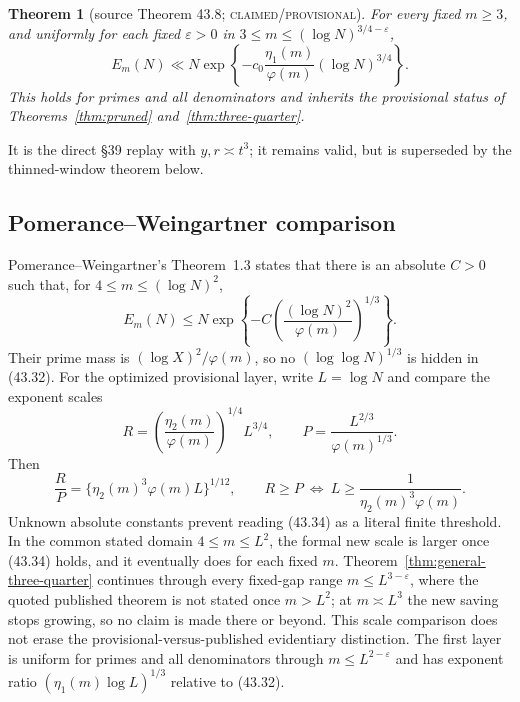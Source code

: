 \documentclass[10pt,reqno]{amsart}
\newtheorem{theorem}{Theorem}[section]
\theoremstyle{definition}
\newcommand{\1}{\mathbf 1}
\newcommand{\eps}{\varepsilon}
\begin{document}
\begin{theorem}[source Theorem 43.8; \textsc{claimed/provisional}]
\label{thm:general-three-quarter-conservative}
For every fixed $m\geq3$, and uniformly for each fixed $\eps>0$ in
$3\leq m\leq(\log N)^{3/4-\eps}$,
\begin{equation}\tag{43.28}
 E_m(N)\ll N\exp\left\{-c_0\frac{\eta_1(m)}{\varphi(m)}
                         (\log N)^{3/4}\right\}.
\end{equation}
This holds for primes and all denominators and inherits the provisional
status of Theorems~\ref{thm:pruned} and~\ref{thm:three-quarter}.
\end{theorem}
It is the direct \S39 replay with $y,r\asymp t^3$; it remains valid, but is
superseded by the thinned-window theorem below.

\subsection{Pomerance--Weingartner comparison}
Pomerance--Weingartner's Theorem~1.3 \cite{PomeranceWeingartner} states that
there is an absolute $C>0$ such that, for $4\leq m\leq(\log N)^2$,
\begin{equation}\tag{43.32}
 E_m(N)\leq N\exp\left\{-C
       \left(\frac{(\log N)^2}{\varphi(m)}\right)^{1/3}\right\}.
\end{equation}
Their prime mass is $(\log X)^2/\varphi(m)$, so no
$(\log\log N)^{1/3}$ is hidden in (43.32).  For the optimized provisional
layer, write $L=\log N$ and compare the exponent scales
\begin{equation}\tag{43.33}
 R=\left(\frac{\eta_2(m)}{\varphi(m)}\right)^{1/4}L^{3/4},
 \qquad P=\frac{L^{2/3}}{\varphi(m)^{1/3}}.
\end{equation}
Then
\begin{equation}\tag{43.34}
 \frac RP=\{\eta_2(m)^3\varphi(m)L\}^{1/12},
 \qquad R\geq P\ \Longleftrightarrow\
 L\geq\frac1{\eta_2(m)^3\varphi(m)}.
\end{equation}
Unknown absolute constants prevent reading (43.34) as a literal finite
threshold.  In the common stated domain $4\leq m\leq L^2$, the formal new
scale is larger once (43.34) holds, and it eventually does for each fixed
$m$.  Theorem~\ref{thm:general-three-quarter} continues through every
fixed-gap range $m\leq L^{3-\eps}$, where the quoted published theorem is
not stated once $m>L^2$; at $m\asymp L^3$ the new saving stops growing, so
no claim is made there or beyond.  This scale comparison does not erase the
provisional-versus-published evidentiary distinction.  The first layer is
uniform for primes and all denominators through $m\leq L^{2-\eps}$ and has
exponent ratio $(\eta_1(m)\log L)^{1/3}$ relative to (43.32).
\end{document}
